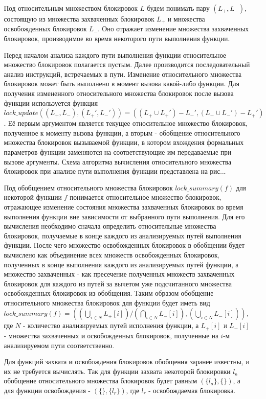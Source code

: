 Под относительным множеством блокировок $L$ будем понимать пару $(L_{+}, L_{-})$, состоящую из множества захваченных блокировок $L_{+}$ и множества освобожденных блокировок $L_{-}$. Оно отражает изменение множества захваченных блокировок, производимое во время некоторого пути выполнения функции.

Перед началом анализа каждого пути выполнения функции относительное множество блокировок полагается пустым. Далее производится последовательный анализ инструкций, встречаемых в пути. Изменение относительного множества блокировок может быть выполнено в момент вызова какой-либо функции. Для получения измененного относительного множества блокировок после вызова функции используется функция $lock\_update((L_{+}, L_{-}), (L_{+}', L_{-}')) = ((L_{+} \cup L_{+}') - L_{-}', (L_{-} \cup L_{-}') - L_{+}')$. Её первым аргументом является текущее относительное множество блокировок, полученное к моменту вызова функции, а вторым - обобщение относительного множества блокировок вызываемой функции, в котором вхождения формальных параметров функции заменяются на соответствующие им передаваемые при вызове аргументы. Схема алгоритма вычисления относительного множества блокировок при анализе пути выполнения функции представлена на рис...

Под обобщением относительного множества блокировок $lock\_summary(f)$ для некоторой функции $f$ понимается относительное множество блокировок, отражающее изменение состояния множества захваченных блокировок во время выполнения функции вне зависимости от выбранного пути выполнения. Для его вычисления необходимо сначала определить относительные множества блокировок, получаемые в конце каждого из анализируемых путей выполнения функции. После чего множество освобожденных блокировок в обобщении будет вычислено как объединение всех множеств освобожденных блокировок, полученных в конце выполнения каждого из анализируемых путей функции, а множество захваченных - как пресечение полученных множеств захваченных блокировок для каждого из путей за вычетом уже подсчитанного множества освобожденных блокировок из обобщения. Таким образом обобщение относительного множества блокировок для функции будет иметь вид $lock\_summary(f) = ((\bigcup_{i \in N}L_{+}[i])/(\bigcap_{i \in N}L_{-}[i]), (\bigcup_{i \in N}L_{-}[i]))$, где $N$ - количество анализируемых путей исполнения функции, а $L_{+}[i]$ и $L_{-}[i]$ - множества захваченных и освобожденных блокировок, полученные на $i$-м анализируемом пути соответственно.

Для функций захвата и освобождения блокировок обобщения заранее известны, и их не требуется вычислять. Так для функции захвата некоторой блокировки $l_{a}$ обобщение относительного множества блокировок будет равным $(\{l_{a}\}, \{\})$, а для функции освобождения - $(\{\}, \{l_{r}\})$, где $l_{r}$ - освобождаемая блокировка.

